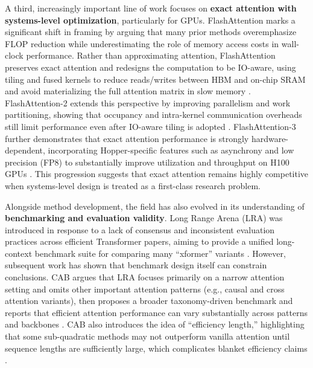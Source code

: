 \documentclass[12pt, a4paper]{article}
\begin{document}
A third, increasingly important line of work focuses on \textbf{exact attention with systems-level optimization}, particularly for GPUs. FlashAttention marks a significant shift in framing by arguing that many prior methods overemphasize FLOP reduction while underestimating the role of memory access costs in wall-clock performance. Rather than approximating attention, FlashAttention preserves exact attention and redesigns the computation to be IO-aware, using tiling and fused kernels to reduce reads/writes between HBM and on-chip SRAM and avoid materializing the full attention matrix in slow memory \parencite{dao2022flashattentionfastmemoryefficientexact}. FlashAttention-2 extends this perspective by improving parallelism and work partitioning, showing that occupancy and intra-kernel communication overheads still limit performance even after IO-aware tiling is adopted \parencite{dao2023flashattention2fasterattentionbetter}. FlashAttention-3 further demonstrates that exact attention performance is strongly hardware-dependent, incorporating Hopper-specific features such as asynchrony and low precision (FP8) to substantially improve utilization and throughput on H100 GPUs \parencite{shah2024flashattention3fastaccurateattention}. This progression suggests that exact attention remains highly competitive when systems-level design is treated as a first-class research problem.

Alongside method development, the field has also evolved in its understanding of \textbf{benchmarking and evaluation validity}. Long Range Arena (LRA) was introduced in response to a lack of consensus and inconsistent evaluation practices across efficient Transformer papers, aiming to provide a unified long-context benchmark suite for comparing many ``xformer'' variants \parencite{tay2020longrangearenabenchmark}. However, subsequent work has shown that benchmark design itself can constrain conclusions. CAB argues that LRA focuses primarily on a narrow attention setting and omits other important attention patterns (e.g., causal and cross attention variants), then proposes a broader taxonomy-driven benchmark and reports that efficient attention performance can vary substantially across patterns and backbones \parencite{zhang2025cabcomprehensiveattentionbenchmarking}. CAB also introduces the idea of ``efficiency length,'' highlighting that some sub-quadratic methods may not outperform vanilla attention until sequence lengths are sufficiently large, which complicates blanket efficiency claims \parencite{zhang2025cabcomprehensiveattentionbenchmarking}.
\end{document}

